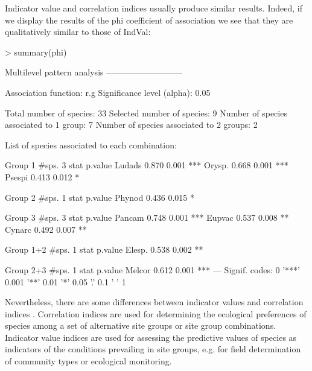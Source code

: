 \documentclass[11pt,a4paper]{article}
\begin{document}
Indicator value and correlation indices usually produce similar results. Indeed, if we display the results of the phi coefficient of association we see that they are qualitatively similar to those of IndVal: 
\begin{Schunk}
\begin{Sinput}
> summary(phi)
\end{Sinput}
\begin{Soutput}
 Multilevel pattern analysis
 ---------------------------

 Association function: r.g
 Significance level (alpha): 0.05

 Total number of species: 33
 Selected number of species: 9 
 Number of species associated to 1 group: 7 
 Number of species associated to 2 groups: 2 

 List of species associated to each combination: 

 Group 1  #sps.  3 
        stat p.value    
Ludads 0.870   0.001 ***
Orysp. 0.668   0.001 ***
Psespi 0.413   0.012 *  

 Group 2  #sps.  1 
        stat p.value  
Phynod 0.436   0.015 *

 Group 3  #sps.  3 
        stat p.value    
Pancam 0.748   0.001 ***
Eupvac 0.537   0.008 ** 
Cynarc 0.492   0.007 ** 

 Group 1+2  #sps.  1 
        stat p.value   
Elesp. 0.538   0.002 **

 Group 2+3  #sps.  1 
        stat p.value    
Melcor 0.612   0.001 ***
---
Signif. codes:  0 '***' 0.001 '**' 0.01 '*' 0.05 '.' 0.1 ' ' 1 
\end{Soutput}
\end{Schunk}
Nevertheless, there are some differences between indicator values and correlation indices \citep{DeCaceres2008}\citep{DeCaceres2009}. Correlation indices are used for determining the ecological preferences of species among a set of alternative site groups or site group combinations. Indicator value indices are used for assessing the predictive values of species as indicators of the conditions prevailing in site groups, e.g. for field determination of community types or ecological monitoring.
\end{document}

